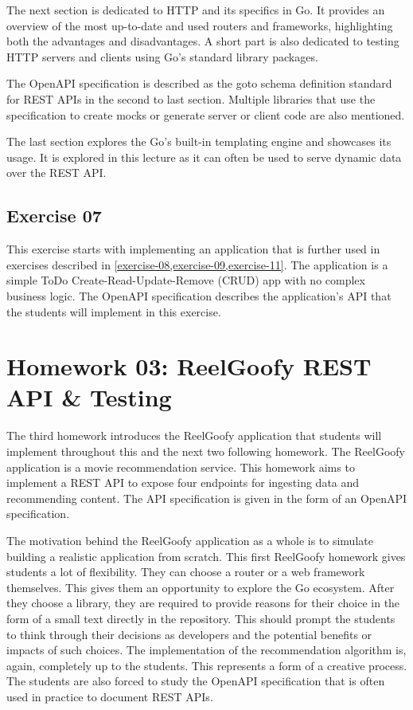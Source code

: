 \documentclass[
  digital,
  color,
  oneside,
  nosansbold,
  nocolorbold,
  nolof,
  nolot,
]{fithesis4}
\begin{document}
The next section is dedicated to HTTP and its specifics in Go. It provides an overview of the most up-to-date and used routers and frameworks, highlighting both the advantages and disadvantages. A short part is also dedicated to testing HTTP servers and clients using Go's standard library packages.

The OpenAPI specification is described as the goto schema definition standard for REST APIs in the second to last section. Multiple libraries that use the specification to create mocks or generate server or client code are also mentioned.

The last section explores the Go's built-in templating engine and showcases its usage. It is explored in this lecture as it can often be used to serve dynamic data over the REST API.

\subsection{Exercise 07}\label{exercise-07}

This exercise starts with implementing an application that is further used in exercises described in \cref{exercise-08,exercise-09,exercise-11}. The application is a simple ToDo Create-Read-Update-Remove (CRUD) app with no complex business logic. The OpenAPI\cite{open-api} specification describes the application's API that the students will implement in this exercise.

\section{Homework 03: ReelGoofy REST API \& Testing}\label{reelgoofy-api}

The third homework introduces the ReelGoofy application that students will implement throughout this and the next two following homework. The ReelGoofy application is a movie recommendation service. This homework aims to implement a REST API to expose four endpoints for ingesting data and recommending content. The API specification is given in the form of an OpenAPI specification.

The motivation behind the ReelGoofy application as a whole is to simulate building a realistic application from scratch. This first ReelGoofy homework gives students a lot of flexibility. They can choose a router or a web framework themselves. This gives them an opportunity to explore the Go ecosystem. After they choose a library, they are required to provide reasons for their choice in the form of a small text directly in the repository. This should prompt the students to think through their decisions as developers and the potential benefits or impacts of such choices. The implementation of the recommendation algorithm is, again, completely up to the students. This represents a form of a creative process. The students are also forced to study the OpenAPI specification that is often used in practice to document REST APIs.
\end{document}

